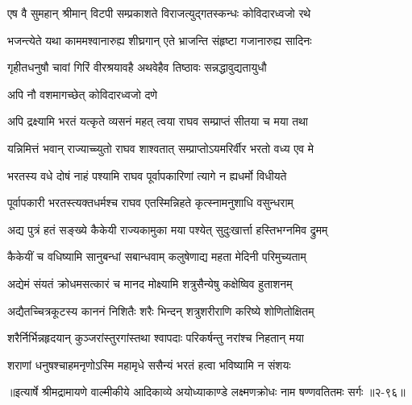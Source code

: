 \twolineshloka
{एष वै सुमहान् श्रीमान् विटपी सम्प्रकाशते}
{विराजत्युद्गतस्कन्धः कोविदारध्वजो रथे} %

\twolineshloka
{भजन्त्येते यथा काममश्वानारुह्य शीघ्रगान्}
{एते भ्राजन्ति संहृष्टा गजानारुह्य सादिनः} %

\twolineshloka
{गृहीतधनुषौ चावां गिरिं वीरश्रयावहै}
{अथवेहैव तिष्ठावः सन्नद्धावुद्यतायुधौ} %

\onelineshloka
{अपि नौ वशमागच्छेत् कोविदारध्वजो दणे} %

\twolineshloka
{अपि द्रक्ष्यामि भरतं यत्कृते व्यसनं महत्}
{त्वया राघव सम्प्राप्तं सीतया च मया तथा} %

\twolineshloka
{यन्निमित्तं भवान् राज्याच्च्युतो राघव शाश्वतात्}
{सम्प्राप्तोऽयमरिर्वीर भरतो वध्य एव मे} %

\twolineshloka
{भरतस्य वधे दोषं नाहं पश्यामि राघव}
{पूर्वापकारिणां त्यागे न ह्यधर्मो विधीयते} %

\twolineshloka
{पूर्वापकारी भरतस्त्यक्तधर्मश्च राघव}
{एतस्मिन्निहते कृत्स्नामनुशाधि वसुन्धराम्} %

\twolineshloka
{अद्य पुत्रं हतं सङ्ख्ये कैकेयी राज्यकामुका}
{मया पश्येत् सुदुःखार्त्ता हस्तिभग्नमिव द्रुमम्} %

\twolineshloka
{कैकेयीं च वधिष्यामि सानुबन्धां सबान्धवाम्}
{कलुषेणाद्य महता मेदिनी परिमुच्यताम्} %

\twolineshloka
{अद्येमं संयतं क्रोधमसत्कारं च मानद}
{मोक्ष्यामि शत्रुसैन्येषु कक्षेष्विव हुताशनम्} %

\twolineshloka
{अद्यैतच्चित्रकूटस्य काननं निशितैः शरैः}
{भिन्दन् शत्रुशरीराणि करिष्ये शोणितोक्षितम्} %

\twolineshloka
{शरैर्निर्भिन्नहृदयान् कुञ्जरांस्तुरगांस्तथा}
{श्वापदाः परिकर्षन्तु नरांश्च निहतान् मया} %

\twolineshloka
{शराणां धनुषश्चाहमनृणोऽस्मि महामृधे}
{ससैन्यं भरतं हत्वा भविष्यामि न संशयः} %


॥इत्यार्षे श्रीमद्रामायणे वाल्मीकीये आदिकाव्ये अयोध्याकाण्डे लक्ष्मणक्रोधः नाम षण्णवतितमः सर्गः ॥२-९६॥
